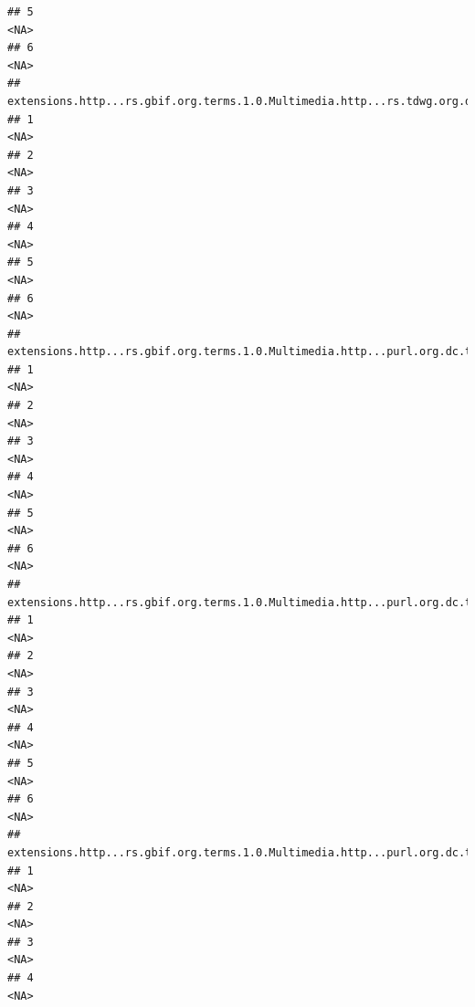 \documentclass[
]{book}
\begin{document}
\begin{verbatim}
## 5                                                                               <NA>
## 6                                                                               <NA>
##   extensions.http...rs.gbif.org.terms.1.0.Multimedia.http...rs.tdwg.org.dwc.terms.catalogNumber.1
## 1                                                                                            <NA>
## 2                                                                                            <NA>
## 3                                                                                            <NA>
## 4                                                                                            <NA>
## 5                                                                                            <NA>
## 6                                                                                            <NA>
##   extensions.http...rs.gbif.org.terms.1.0.Multimedia.http...purl.org.dc.terms.publisher.1
## 1                                                                                    <NA>
## 2                                                                                    <NA>
## 3                                                                                    <NA>
## 4                                                                                    <NA>
## 5                                                                                    <NA>
## 6                                                                                    <NA>
##   extensions.http...rs.gbif.org.terms.1.0.Multimedia.http...purl.org.dc.terms.license.1
## 1                                                                                  <NA>
## 2                                                                                  <NA>
## 3                                                                                  <NA>
## 4                                                                                  <NA>
## 5                                                                                  <NA>
## 6                                                                                  <NA>
##   extensions.http...rs.gbif.org.terms.1.0.Multimedia.http...purl.org.dc.terms.created.1
## 1                                                                                  <NA>
## 2                                                                                  <NA>
## 3                                                                                  <NA>
## 4                                                                                  <NA>

\end{verbatim}
\end{document}
